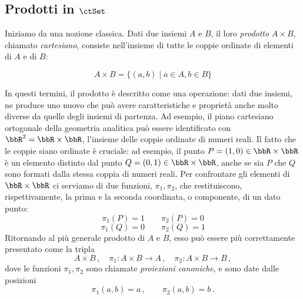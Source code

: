 \subsection*{Prodotti in \(\ctSet\)}\label{prod_in_Set}

Iniziamo da una nozione classica.
Dati due insiemi \(A\) e \(B\), il loro \emph{prodotto} \(A\times B\), chiamato \emph{cartesiano}, consiste nell'insieme di tutte le coppie ordinate di elementi di \(A\) e di \(B\):

\[
	A\times B= \{(a,b)\mid a\in A, b\in B\}
\]

In questi termini, il prodotto è descritto come una operazione: dati due insiemi, ne produce uno nuovo che può avere caratteristiche e proprietà anche molto diverse da quelle degli insiemi di partenza. Ad esempio, il piano cartesiano ortogonale della geometria analitica può essere identificato con \(\bbR^2=\bbR\times\bbR\), l'insieme delle coppie ordinate di numeri reali. Il fatto che le coppie siano ordinate è cruciale: ad esempio, il punto \(P=(1,0)\in \bbR\times\bbR\) è un elemento distinto dal punto \(Q=(0,1)\in \bbR\times\bbR\), anche se sia \(P\) che \(Q\) sono formati dalla stessa coppia di numeri reali. Per confrontare gli elementi di \(\bbR\times\bbR\) ci serviamo di due funzioni, \(\pi_1,\pi_2\), che restituiscono, rispettivamente, la prima e la seconda coordinata, o componente, di un dato punto:
\[
	\pi_1(P)=1\qquad \pi_2(P)=0
\]
\[
	\pi_1(Q)=0\qquad \pi_2(Q)=1
\]
Ritornando al più generale prodotto di \(A\) e \(B\), esso può essere più correttamente presentato come la tripla
\[
	A\times B\,,\quad \pi_1\colon A\times B\to A\,,\quad \pi_2\colon A\times B\to B\,,
\]
dove le funzioni \(\pi_1,\pi_2\) sono chiamate \emph{proiezioni canoniche}, e sono date dalle posizioni
\[
	\pi_1(a,b)=a\,,\qquad \pi_2(a,b)=b\,.
\]

